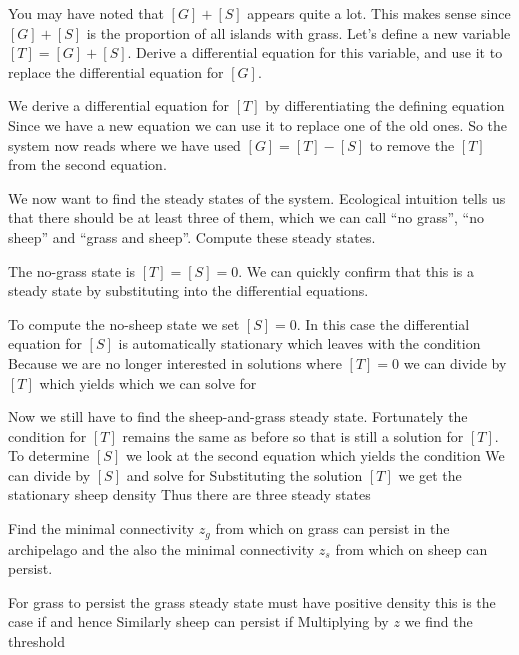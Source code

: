 \subquestion
You may have noted that $[G]+[S]$ appears quite a lot. This makes sense since $[G]+[S]$ is the proportion of all islands with grass. Let's define a new variable $[T]=[G]+[S]$. Derive a differential equation for this variable, and use it to replace the differential equation for $[G]$.

\solution
We derive a differential equation for $[T]$ by differentiating the defining equation 
Since we have a new equation we can use it to replace one of the old ones. So the system now reads
where we have used $[G]=[T]-[S]$ to remove the $[T]$ from the second equation. 

\subquestion
We now want to find the steady states of the system. Ecological intuition tells us that there should be at least three of them, which we can call ``no grass'', ``no sheep'' and ``grass and sheep''. Compute these steady states. 

\solution
The no-grass state is $[T]=[S]=0$. We can quickly confirm that this is a steady state by substituting into the differential equations.

To compute the no-sheep state we set $[S]=0$. In this case the differential equation for $[S]$ is automatically stationary which leaves with the condition
Because we are no longer interested in solutions where $[T]=0$ we can divide by $[T]$ which yields 
which we can solve for 

Now we still have to find the sheep-and-grass steady state. Fortunately the condition for $[T]$ remains the same as before so that 
is still a solution for $[T]$. To determine $[S]$ we look at the second equation which yields the condition
We can divide by $[S]$ 
and solve for 
Substituting the solution $[T]$ we get the stationary sheep density 
Thus there are three steady states 

\subquestion
Find the minimal connectivity $z_g$ from which on grass can persist in the archipelago and the also the minimal connectivity $z_s$ from which on sheep can persist.

\solution
For grass to persist the grass steady state must have positive density this is the case if 
and hence
Similarly sheep can persist if 
Multiplying by $z$ we find the threshold
